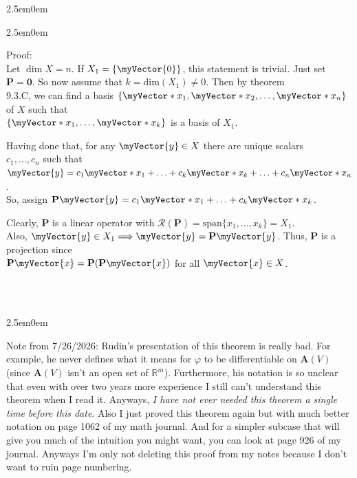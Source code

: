 \documentclass{book}
\newcommand{\hThree}{%
   \color{PineGreen!85!Orange}
   \fontsize{13}{15}\selectfont%
}
\newenvironment{myIndent}{%
   \begin{adjustwidth}{2.5em}{0em}%
}{%
   \end{adjustwidth}%
}
\newcommand{\mySpan}{\mathrm{span}}
\newcommand{\myDim}[1]{\mathrm{dim}(#1)}
\newcommand{\rangeSp}[1]{\mathscr{R}(#1)}
\newcommand{\mySepOne}[1][.]{%
   {\noindent\color{#1}{\rule{6.5in}{1mm}}}\\%
}
\newcommand{\retTwo}{\hfill\bigbreak}
\newcommand{\mVec}[1]{\myVector{#1}}
\newcommand{\mVecAst}[1]{\myVector*{#1}}
\newcommand{\mMat}[1]{\mathbf{#1}}
\begin{document}
{\begin{myIndent}
\begin{itemize}
      {\begin{myIndent}\hThree
         Proof:\\
         Let $\dim{X} = n$. If $X_1 = \{\mVec{0}\}$, this statement is trivial. Just set\\ $\mMat{P} = \mMat{0}$. So now assume that $k = \myDim{X_1} \neq 0$. Then by theorem\\ 9.3.C, we can find a basis $\{\mVecAst{x}_1, \mVecAst{x}_2, \ldots, \mVecAst{x}_n\}$ of $X$ such that\\ $\{\mVecAst{x}_1, \ldots, \mVecAst{x}_k\}$ is a basis of $X_1$.\retTwo

         Having done that, for any $\mVec{y} \in X$ there are unique scalars\\ $c_1, \ldots, c_n$ such that $\mVec{y} = c_1\mVecAst{x}_1 + \ldots + c_k\mVecAst{x}_k + \ldots + c_n\mVecAst{x}_n$.\\ So, assign $\mMat{P}\mVec{y} = c_1\mVecAst{x}_1 + \ldots + c_k\mVecAst{x}_k$.\retTwo
         
         Clearly, $\mMat{P}$ is a linear operator with $\rangeSp{\mMat{P}} = \mySpan \{x_1, \ldots, x_k\} = X_1$.\\ Also, $\mVec{y} \in X_1 \Longrightarrow \mVec{y} = \mMat{P}\mVec{y}$. Thus, $\mMat{P}$ is  a projection since\\ $\mMat{P}\mVec{x} = \mMat{P}(\mMat{P}\mVec{x})$ for all $\mVec{x} \in X$.
      \end{myIndent}}
   \end{itemize}
\end{myIndent}}

\color{red}\mySepOne\\ [-24pt]
\begin{myIndent}
	Note from 7/26/2026: Rudin's presentation of this theorem is really bad. For example, he never defines what it means for $\varphi$ to be differentiable on $\mMat{A}(V)$ (since $\mMat{A}(V)$ isn't an open set of $\mathbb{R}^m$). Furthermore, his notation is so unclear that even with over two years more experience I still can't understand this theorem when I read it. Anyways, \textit{I have not ever needed this theorem a single time before this date}. Also I just proved this theorem again but with much better notation on page 1062 of my math journal. And for a simpler subcase that will give you much of the intuition you might want, you can look at page 926 of my journal. Anyways I'm only not deleting this proof from my notes because I don't want to ruin page numbering.\retTwo
\end{myIndent}
\end{document}
